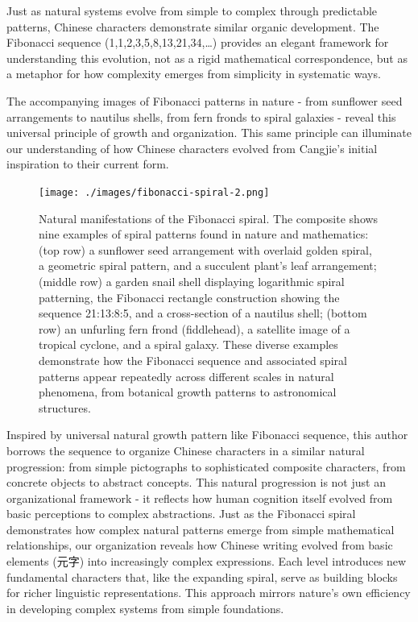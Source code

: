 Just as natural systems evolve from simple to complex through
predictable patterns, Chinese characters demonstrate similar organic
development. The Fibonacci sequence (1,1,2,3,5,8,13,21,34,\ldots)
provides an elegant framework for understanding this evolution, not as a
rigid mathematical correspondence, but as a metaphor for how complexity
emerges from simplicity in systematic ways.

The accompanying images of Fibonacci patterns in nature - from sunflower
seed arrangements to nautilus shells, from fern fronds to spiral
galaxies - reveal this universal principle of growth and organization.
This same principle can illuminate our understanding of how Chinese
characters evolved from Cangjie's initial inspiration to their current
form.

\begin{figure}
\centering
\texttt{[image: ./images/fibonacci-spiral-2.png]}
\caption{Natural manifestations of the Fibonacci spiral. The composite
shows nine examples of spiral patterns found in nature and mathematics:
(top row) a sunflower seed arrangement with overlaid golden spiral, a
geometric spiral pattern, and a succulent plant's leaf arrangement;
(middle row) a garden snail shell displaying logarithmic spiral
patterning, the Fibonacci rectangle construction showing the sequence
21:13:8:5, and a cross-section of a nautilus shell; (bottom row) an
unfurling fern frond (fiddlehead), a satellite image of a tropical
cyclone, and a spiral galaxy. These diverse examples demonstrate how the
Fibonacci sequence and associated spiral patterns appear repeatedly
across different scales in natural phenomena, from botanical growth
patterns to astronomical structures.}
\end{figure}

Inspired by universal natural growth pattern like Fibonacci sequence,
this author borrows the sequence to organize Chinese characters in a
similar natural progression: from simple pictographs to sophisticated
composite characters, from concrete objects to abstract concepts. This
natural progression is not just an organizational framework - it
reflects how human cognition itself evolved from basic perceptions to
complex abstractions. Just as the Fibonacci spiral demonstrates how
complex natural patterns emerge from simple mathematical relationships,
our organization reveals how Chinese writing evolved from basic elements
(元字) into increasingly complex expressions. Each level introduces new
fundamental characters that, like the expanding spiral, serve as
building blocks for richer linguistic representations. This approach
mirrors nature's own efficiency in developing complex systems from
simple foundations.

